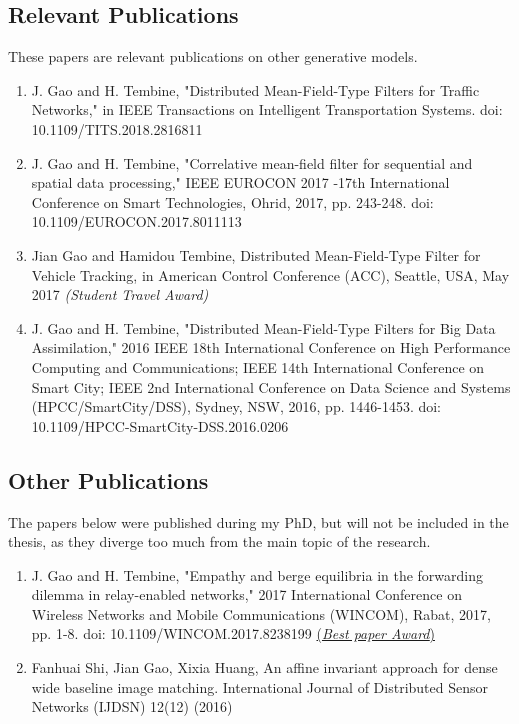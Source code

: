 \documentclass{article}
\begin{document}
\subsection{Relevant Publications}
These papers are relevant publications on other generative models.
\begin{enumerate}
\item J. Gao and H. Tembine, "Distributed Mean-Field-Type Filters for Traffic Networks," in IEEE Transactions on Intelligent Transportation Systems. doi: 10.1109/TITS.2018.2816811
\item J. Gao and H. Tembine, "Correlative mean-field filter for sequential and spatial data processing," IEEE EUROCON 2017 -17th International Conference on Smart Technologies, Ohrid, 2017, pp. 243-248. doi: 10.1109/EUROCON.2017.8011113
\item Jian Gao and Hamidou Tembine, Distributed Mean-Field-Type Filter for Vehicle Tracking, in American Control Conference (ACC), Seattle, USA, May 2017 \textit{(Student Travel Award)}
\item J. Gao and H. Tembine, "Distributed Mean-Field-Type Filters for Big Data Assimilation," 2016 IEEE 18th International Conference on High Performance Computing and Communications; IEEE 14th International Conference on Smart City; IEEE 2nd International Conference on Data Science and Systems (HPCC/SmartCity/DSS), Sydney, NSW, 2016, pp. 1446-1453. doi: 10.1109/HPCC-SmartCity-DSS.2016.0206
\end{enumerate}


\subsection{Other Publications}
The papers below were published during my PhD, but will not be included in the thesis, as they diverge too much from the main topic of the research.
\begin{enumerate}
\item J. Gao and H. Tembine, "Empathy and berge equilibria in the forwarding dilemma in relay-enabled networks," 2017 International Conference on Wireless Networks and Mobile Communications (WINCOM), Rabat, 2017, pp. 1-8. doi: 10.1109/WINCOM.2017.8238199 \href{https://nyuad.nyu.edu/en/news/latest-news/science-and-technology/2017/december/next-generation-cell-phone-networks.html}{(\textit{Best paper Award})}
\item Fanhuai Shi, Jian Gao, Xixia Huang, An affine invariant approach for dense wide baseline image matching. International Journal of Distributed Sensor Networks (IJDSN) 12(12) (2016)
\end{enumerate}
\end{document}
